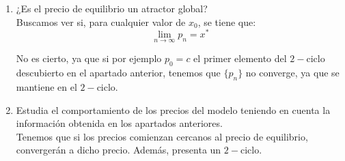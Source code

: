 \begin{ejercicio}
\begin{enumerate}
        \item ¿Es el precio de equilibrio un atractor global?\\

        Buscamos ver si, para cualquier valor de $x_0$, se tiene que:
        \begin{equation*}
            \lim_{n\to \infty} p_n = x^\ast
        \end{equation*}

        No es cierto, ya que si por ejemplo $p_0=c$ el primer elemento del $2-$ciclo descubierto en el apartado anterior, tenemos que $\{p_n\}$ no converge, ya que se mantiene en el $2-$ciclo.
        
        \item Estudia el comportamiento de los precios del modelo teniendo en cuenta la información obtenida en los apartados anteriores.\\

        Tenemos que si los precios comienzan cercanos al precio de equilibrio, convergerán a dicho precio. Además, presenta un $2-$ciclo.
    \end{enumerate}
\end{ejercicio}
